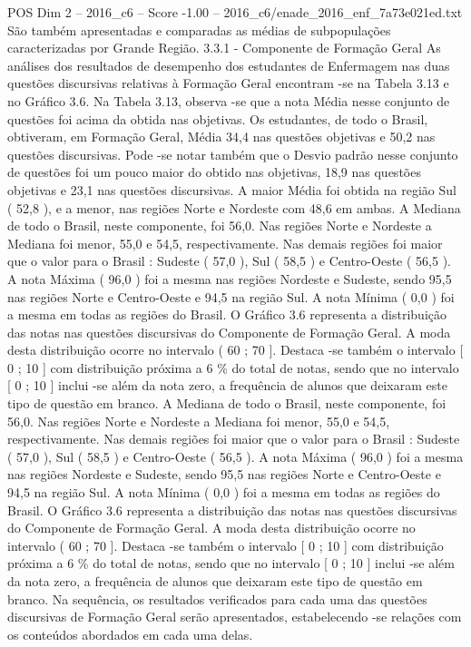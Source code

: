 \begin{textsample}{POS Dim 2 – 2016\_c6 – Score -1.00 – 2016\_c6/enade\_2016\_enf\_7a73e021ed.txt}
São também apresentadas e comparadas as médias de subpopulações caracterizadas por Grande Região. 3.3.1 - Componente de Formação Geral As análises dos resultados de desempenho dos estudantes de Enfermagem nas duas questões discursivas relativas à Formação Geral encontram -se na Tabela 3.13 e no Gráfico 3.6.
Na Tabela 3.13, observa -se que a nota Média nesse conjunto de questões foi acima da obtida nas objetivas.
Os estudantes, de todo o Brasil, obtiveram, em Formação Geral, Média 34,4 nas questões objetivas e 50,2 nas questões discursivas.
Pode -se notar também que o Desvio padrão nesse conjunto de questões foi um pouco maior do obtido nas objetivas, 18,9 nas questões objetivas e 23,1 nas questões discursivas.
A maior Média foi obtida na região Sul ( 52,8 ), e a menor, nas regiões Norte e Nordeste com 48,6 em ambas.
A Mediana de todo o Brasil, neste componente, foi 56,0.
Nas regiões Norte e Nordeste a Mediana foi menor, 55,0 e 54,5, respectivamente.
Nas demais regiões foi maior que o valor para o Brasil : Sudeste ( 57,0 ), Sul ( 58,5 ) e Centro-Oeste ( 56,5 ).
A nota Máxima ( 96,0 ) foi a mesma nas regiões Nordeste e Sudeste, sendo 95,5 nas regiões Norte e Centro-Oeste e 94,5 na região Sul.
A nota Mínima ( 0,0 ) foi a mesma em todas as regiões do Brasil.
O Gráfico 3.6 representa a distribuição das notas nas questões discursivas do Componente de Formação Geral.
A moda desta distribuição ocorre no intervalo ( 60 ; 70 ].
Destaca -se também o intervalo [ 0 ; 10 ] com distribuição próxima a 6 \% do total de notas, sendo que no intervalo [ 0 ; 10 ] inclui -se além da nota zero, a frequência de alunos que deixaram este tipo de questão em branco.
A Mediana de todo o Brasil, neste componente, foi 56,0.
Nas regiões Norte e Nordeste a Mediana foi menor, 55,0 e 54,5, respectivamente.
Nas demais regiões foi maior que o valor para o Brasil : Sudeste ( 57,0 ), Sul ( 58,5 ) e Centro-Oeste ( 56,5 ).
A nota Máxima ( 96,0 ) foi a mesma nas regiões Nordeste e Sudeste, sendo 95,5 nas regiões Norte e Centro-Oeste e 94,5 na região Sul.
A nota Mínima ( 0,0 ) foi a mesma em todas as regiões do Brasil.
O Gráfico 3.6 representa a distribuição das notas nas questões discursivas do Componente de Formação Geral.
A moda desta distribuição ocorre no intervalo ( 60 ; 70 ].
Destaca -se também o intervalo [ 0 ; 10 ] com distribuição próxima a 6 \% do total de notas, sendo que no intervalo [ 0 ; 10 ] inclui -se além da nota zero, a frequência de alunos que deixaram este tipo de questão em branco.
Na sequência, os resultados verificados para cada uma das questões discursivas de Formação Geral serão apresentados, estabelecendo -se relações com os conteúdos abordados em cada uma delas.

\end{textsample}
